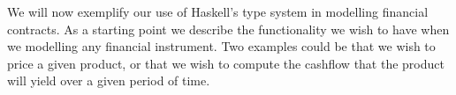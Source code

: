 \documentclass[11pt]{article}
\begin{document}

We will now exemplify our use of Haskell's type system in modelling financial contracts.
As a starting point we describe the functionality we wish to have when we modelling
any financial instrument. Two examples could be that we wish to price a given
product, or that we wish to compute the cashflow that the product will yield
over a given period of time.
\end{document}

